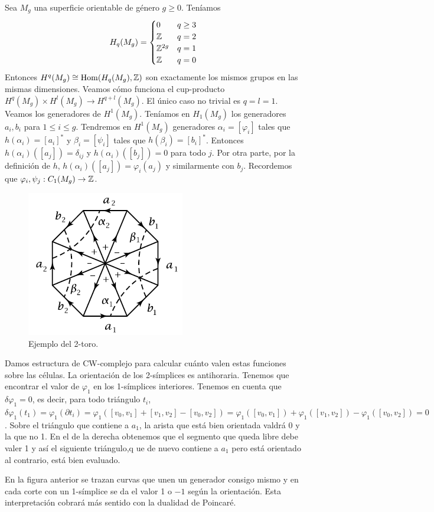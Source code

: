 \documentclass[TA.tex]{subfiles}
\begin{document}
\begin{ej}
Sea $M_g$ una superficie orientable de género $g\geq 0$. Teníamos $$H_q(M_g)=\begin{cases}
0 & q\geq 3\\
\mathbb{Z} & q=2\\
\mathbb{Z}^{2g} & q=1\\
\mathbb{Z} & q=0
\end{cases}$$
Entonces $H^q(M_g)\cong \operatorname{Hom}(H_q(M_g),\mathbb{Z})$ son exactamente los mismos grupos en las mismas dimensiones. Veamos cómo funciona el cup-producto $H^q(M_g)\times H^l(M_g)\to H^{q+l}(M_g)$. El único caso no trivial es $q=l=1$. Veamos los generadores de $H^1(M_g)$. Teníamos en $H_1(M_g)$ los generadores $a_i,b_i$ para $1\leq i\leq g$. Tendremos en $H^1(M_g)$ generadores $\alpha_i=[\varphi_i]$ tales que $h(\alpha_i)=[a_i]^*$ y $\beta_i=[\psi_i]$ tales que $h(\beta_i)=[b_i]^*$. Entonces $h(\alpha_i)([a_j])=\delta_{ij}$ y $h(\alpha_i)([b_j])=0$ para todo $j$. Por otra parte, por la definición de $h$, $h(\alpha_i)([a_j])=\varphi_i(a_j)$ y similarmente con $b_j$. Recordemos que $\varphi_i,\psi_j:C_1(M_g)\to \mathbb{Z}$. 

\begin{figure}[h!]
\includegraphics[scale=0.7]{cup}
\caption{Ejemplo del 2-toro.}
\end{figure}

Damos estructura de CW-complejo para calcular cuánto valen estas funciones sobre las células. La orientación de los 2-símplices es antihoraria. Tenemos que encontrar el valor de $\varphi_1$ en los 1-símplices interiores. Tenemos en cuenta que $\delta\varphi_1=0$, es decir, para todo triángulo $t_i$, $\delta\varphi_1(t_1)=\varphi_1(\partial t_i)=\varphi_1([v_0,v_1]+[v_1,v_2]-[v_0,v_2])=\varphi_1([v_0,v_1])+\varphi_1([v_1,v_2])-\varphi_1([v_0,v_2])=0$. Sobre el triángulo que contiene a $a_1$, la arista que está bien orientada valdrá 0 y la que no 1. En el de la derecha obtenemos que el segmento que queda libre debe valer 1 y así el siguiente triángulo,q ue de nuevo contiene a $a_1$ pero está orientado al contrario, está bien evaluado. 

En la figura anterior se trazan curvas que unen un generador consigo mismo y en cada corte con un 1-símplice se da el valor 1 o $-1$ según la orientación. Esta interpretación cobrará más sentido con la dualidad de Poincaré. 

\end{ej}
\end{document}
